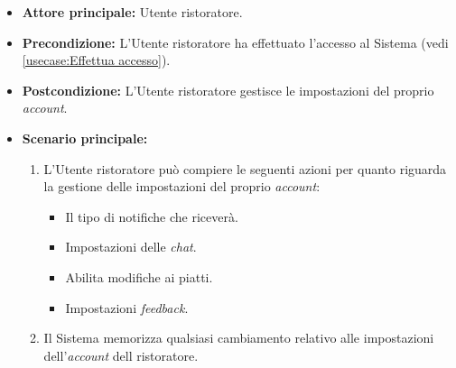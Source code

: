 \label{usecase:Impostazioni account ristoratore}
\begin{itemize}
	\item \textbf{Attore principale:} Utente ristoratore.

	\item \textbf{Precondizione:} L'Utente ristoratore ha effettuato l'accesso al Sistema (vedi \autoref{usecase:Effettua accesso}).

	\item \textbf{Postcondizione:} L'Utente ristoratore gestisce le impostazioni del proprio \textit{account}.


	\item \textbf{Scenario principale:}
	      \begin{enumerate}

		      \item L'Utente ristoratore può compiere le seguenti azioni per quanto riguarda la gestione delle impostazioni del proprio \textit{account}:
		      \begin{itemize}
                \item Il tipo di notifiche che riceverà.
                \item Impostazioni delle \textit{chat}.
                \item Abilita modifiche ai piatti.
                \item Impostazioni \textit{feedback}.
              \end{itemize}
              \item Il Sistema memorizza qualsiasi cambiamento relativo alle impostazioni dell'\textit{account} dell ristoratore.
	      \end{enumerate}
\end{itemize}
